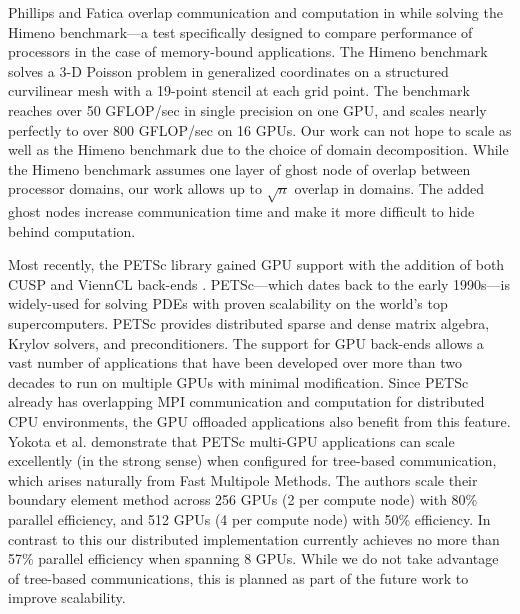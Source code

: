 \documentclass[11pt]{report}
\begin{document}

Phillips and Fatica overlap communication and computation in \cite{Phillips2010} while solving the Himeno benchmark---a test specifically designed to compare performance of processors in the case of memory-bound applications. The Himeno benchmark solves a 3-D Poisson problem in generalized coordinates on a structured curvilinear mesh with a 19-point stencil at each grid point. The benchmark reaches over 50 GFLOP/sec in single precision on one GPU, and scales nearly perfectly to over 800 GFLOP/sec on 16 GPUs. Our work can not hope to scale as well as the Himeno benchmark due to the choice of domain decomposition. While the Himeno benchmark assumes one layer of ghost node of overlap between processor domains, our work allows up to $\sqrt{n}$ overlap in domains. The added ghost nodes increase communication time and make it more difficult to hide behind computation.  




Most recently, the PETSc library gained GPU support with the addition of both CUSP \cite{Cusp2012} and ViennCL \cite{Rupp2010} back-ends \cite{Minden2010}. PETSc---which dates back to the early 1990s---is widely-used for solving PDEs with proven scalability on the world's top supercomputers. PETSc provides distributed sparse and dense matrix algebra, Krylov solvers, and preconditioners. The support for GPU back-ends allows a vast number of applications that have been developed over more than two decades to run on multiple GPUs with minimal modification. Since PETSc already has overlapping MPI communication and computation for distributed CPU environments, the GPU offloaded applications also benefit from this feature. Yokota et al. \cite{YokotaGPU2010} demonstrate that PETSc multi-GPU applications can scale excellently (in the strong sense) when configured for tree-based communication, which arises naturally from Fast Multipole Methods. The authors scale their boundary element method across 256 GPUs (2 per compute node) with 80\% parallel efficiency, and 512 GPUs (4 per compute node) with 50\% efficiency. In contrast to this our distributed implementation currently achieves no more than 57\% parallel efficiency when spanning 8 GPUs. While we do not take advantage of tree-based communications, this is planned as part of the future work to improve scalability. 
\end{document}
